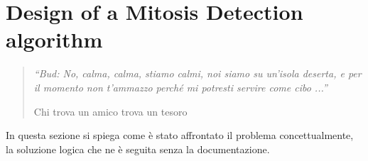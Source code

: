 \chapter{Design of a Mitosis Detection algorithm}
\label{chapter4}
\thispagestyle{empty}

\begin{quotation}
{\footnotesize
\noindent \emph{``Bud: No, calma, calma, stiamo calmi, noi siamo su un'isola deserta, e per il momento non t'ammazzo perch\'e mi potresti servire come cibo ...''}
\begin{flushright}
Chi trova un amico trova un tesoro
\end{flushright}
}
\end{quotation}
\vspace{0.5cm}

\noindent In questa sezione si spiega come \`e stato affrontato il problema concettualmente, la soluzione logica che ne \`e seguita senza la documentazione.


